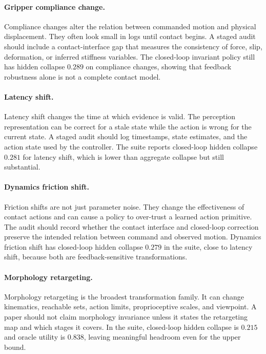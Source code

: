\documentclass{article}
\begin{document}
\paragraph{Gripper compliance change.}
Compliance changes alter the relation between commanded motion and physical displacement. They often look small in logs until contact begins. A staged audit should include a contact-interface gap that measures the consistency of force, slip, deformation, or inferred stiffness variables. The closed-loop invariant policy still has hidden collapse $0.289$ on compliance changes, showing that feedback robustness alone is not a complete contact model.

\paragraph{Latency shift.}
Latency shift changes the time at which evidence is valid. The perception representation can be correct for a stale state while the action is wrong for the current state. A staged audit should log timestamps, state estimates, and the action state used by the controller. The suite reports closed-loop hidden collapse $0.281$ for latency shift, which is lower than aggregate collapse but still substantial.

\paragraph{Dynamics friction shift.}
Friction shifts are not just parameter noise. They change the effectiveness of contact actions and can cause a policy to over-trust a learned action primitive. The audit should record whether the contact interface and closed-loop correction preserve the intended relation between command and observed motion. Dynamics friction shift has closed-loop hidden collapse $0.279$ in the suite, close to latency shift, because both are feedback-sensitive transformations.

\paragraph{Morphology retargeting.}
Morphology retargeting is the broadest transformation family. It can change kinematics, reachable sets, action limits, proprioceptive scales, and viewpoint. A paper should not claim morphology invariance unless it states the retargeting map and which stages it covers. In the suite, closed-loop hidden collapse is $0.215$ and oracle utility is $0.838$, leaving meaningful headroom even for the upper bound.
\end{document}
